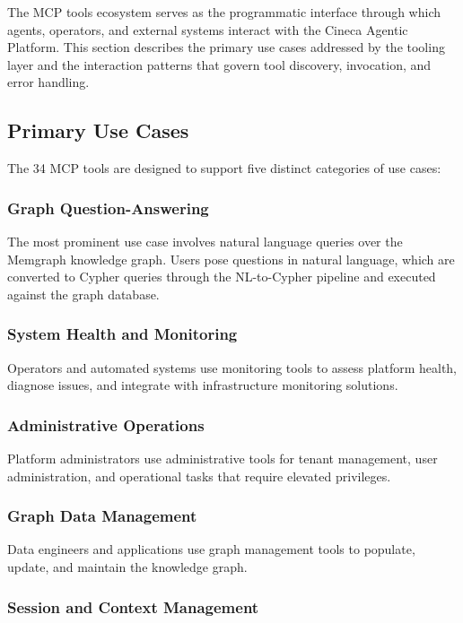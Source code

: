\documentclass[a4paper,twoside]{sapthesis}
\begin{document}
The MCP tools ecosystem serves as the programmatic interface through which agents, operators, and external systems interact with the Cineca Agentic Platform. This section describes the primary use cases addressed by the tooling layer and the interaction patterns that govern tool discovery, invocation, and error handling.

\subsection{Primary Use Cases}
\label{subsec:tool-use-cases}

The 34 MCP tools are designed to support five distinct categories of use cases:

\subsubsection{Graph Question-Answering}

The most prominent use case involves natural language queries over the Memgraph knowledge graph. Users pose questions in natural language, which are converted to Cypher queries through the NL-to-Cypher pipeline and executed against the graph database.

\subsubsection{System Health and Monitoring}

Operators and automated systems use monitoring tools to assess platform health, diagnose issues, and integrate with infrastructure monitoring solutions.

\subsubsection{Administrative Operations}

Platform administrators use administrative tools for tenant management, user administration, and operational tasks that require elevated privileges.

\subsubsection{Graph Data Management}

Data engineers and applications use graph management tools to populate, update, and maintain the knowledge graph.

\subsubsection{Session and Context Management}
\end{document}
